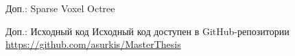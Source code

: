 \begin{frame}{Доп.: Sparse Voxel Octree}
\begin{minipage}{.2\textwidth}
    \end{minipage}
\end{frame}

\begin{frame}{Доп.: Исходный код}
    Исходный код доступен в GitHub-репозитории\\
    \url{https://github.com/asurkis/MasterThesis}

    \bigskip

    \begin{center}
    \end{center}
\end{frame}

